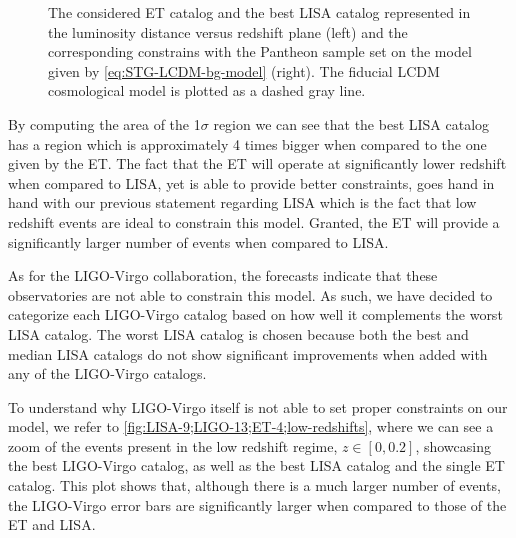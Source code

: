 \begin{figure}[h!]
\begin{subfigure}[b]{0.49\textwidth}
    \end{subfigure}
    \caption[The considered ET catalog and the best LISA catalog represented in the luminosity distance versus redshift plane (left) and the corresponding constrains with the Pantheon sample set on the $f(Q)$ model with $\Lambda$CDM background (right). The fiducial $\Lambda$CDM cosmological model is plotted as a dashed gray line.]
    {The considered \gls{ET} catalog and the best \gls{LISA} catalog represented in the luminosity distance versus redshift plane (left) and the corresponding constrains with the Pantheon sample set on the model given by \cref{eq:STG-LCDM-bg-model} (right). The fiducial \gls{LCDM} cosmological model is plotted as a dashed gray line.}
    \label{fig:fQ-LCDM-bg_LISA_ET}
\end{figure}

By computing the area of the 1$\sigma$ region we can see that the best \gls{LISA} catalog has a region which is approximately 4 times bigger when compared to the one given by the \gls{ET}. The fact that the \gls{ET} will operate at significantly lower redshift when compared to \gls{LISA}, yet is able to provide better constraints, goes hand in hand with our previous statement regarding \gls{LISA} which is the fact that low redshift events are ideal to constrain this model. Granted, the \gls{ET} will provide a significantly larger number of events when compared to \gls{LISA}.

As for the \gls{LIGO}-Virgo collaboration, the forecasts indicate that these observatories are not able to constrain this model. As such, we have decided to categorize each \gls{LIGO}-Virgo catalog based on how well it complements the worst \gls{LISA} catalog. The worst \gls{LISA} catalog is chosen because both the best and median \gls{LISA} catalogs do not show significant improvements when added with any of the \gls{LIGO}-Virgo catalogs.

To understand why \gls{LIGO}-Virgo itself is not able to set proper constraints on our model, we refer to \cref{fig:LISA-9;LIGO-13;ET-4;low-redshifts}, where we can see a zoom of the events present in the low redshift regime, $z \in [0, 0.2]$, showcasing the best \gls{LIGO}-Virgo catalog, as well as the best \gls{LISA} catalog and the single \gls{ET} catalog. This plot shows that, although there is a much larger number of events, the \gls{LIGO}-Virgo error bars are significantly larger when compared to those of the \gls{ET} and \gls{LISA}.


